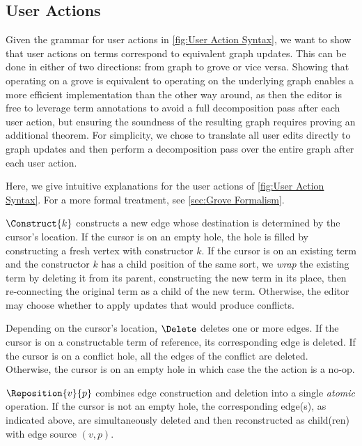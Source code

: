 


\figureUserActionSyntax

\subsection{User Actions}%
\label{sub:User Actions}


Given the grammar for user actions in \autoref{fig:User Action Syntax}, we want to show that user actions on terms correspond to equivalent graph updates. This can be done in either of two directions: from graph to grove or vice versa. Showing that operating on a grove is equivalent to operating on the underlying graph enables a more efficient implementation than the other way around, as then the editor is free to leverage term annotations to avoid a full decomposition pass after each user action, but ensuring the soundness of the resulting graph requires proving an additional theorem. For simplicity, we chose to translate all user edits directly to graph updates and then perform a decomposition pass over the entire graph after each user action.

Here, we give intuitive explanations for the user actions of \autoref{fig:User Action Syntax}. For a more formal treatment, see \autoref{sec:Grove Formalism}.

$\Construct{k}$ constructs a new edge whose destination is determined by the cursor's location. If the cursor is on an empty hole, the hole is filled by constructing a fresh vertex with constructor $k$. If the cursor is on an existing term and the constructor $k$ has a child position of the same sort, we \emph{wrap} the existing term by deleting it from its parent, constructing the new term in its place, then re-connecting the original term as a child of the new term. Otherwise, the editor may choose whether to apply updates that would produce conflicts.

Depending on the cursor's location, $\Delete$ deletes one or more edges. If the cursor is on a constructable term of reference, its corresponding edge is deleted. If the cursor is on a conflict hole, all the edges of the conflict are deleted. Otherwise, the cursor is on an empty hole in which case the the action is a no-op.

$\Reposition{v}{p}$ combines edge construction and deletion into a single \emph{atomic} operation. If the cursor is not an empty hole, the corresponding edge(s), as indicated above, are simultaneously deleted and then reconstructed as child(ren) with edge source $(v,p)$.


